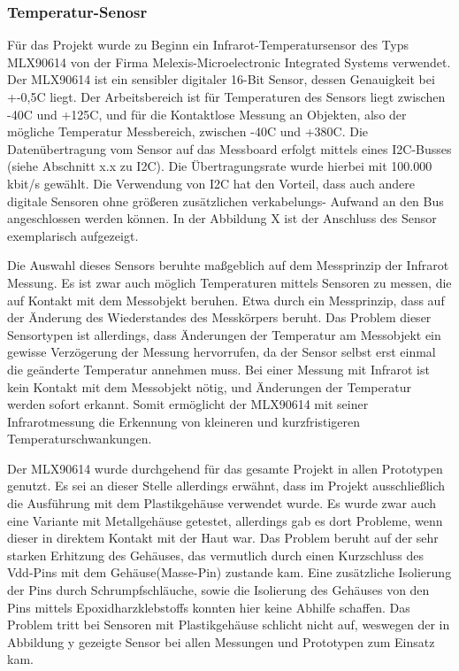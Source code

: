 \subsubsection{Temperatur-Senosr} \label{temp-1}

Für das Projekt wurde zu Beginn ein Infrarot-Temperatursensor des Typs MLX90614 von der Firma Melexis-Microelectronic Integrated Systems verwendet. Der MLX90614 ist ein sensibler digitaler  16-Bit Sensor, dessen Genauigkeit bei +-0,5C liegt. Der Arbeitsbereich ist für Temperaturen des Sensors liegt zwischen -40C und +125C, und für die Kontaktlose Messung an Objekten, also der mögliche Temperatur Messbereich, zwischen -40C und +380C. Die Datenübertragung vom Sensor auf das Messboard erfolgt mittels eines I2C-Busses (siehe Abschnitt x.x zu I2C). Die Übertragungsrate wurde hierbei mit 100.000 kbit/s gewählt. Die Verwendung von I2C hat den Vorteil, dass auch andere digitale Sensoren ohne größeren zusätzlichen verkabelungs- Aufwand an den Bus angeschlossen werden können. In der Abbildung X ist der Anschluss des Sensor exemplarisch aufgezeigt.


Die Auswahl dieses Sensors beruhte maßgeblich auf dem Messprinzip der Infrarot Messung. Es ist zwar auch möglich Temperaturen mittels Sensoren zu messen, die auf Kontakt mit dem Messobjekt beruhen. Etwa durch ein Messprinzip, dass auf der Änderung des Wiederstandes des Messkörpers beruht. Das Problem dieser Sensortypen ist allerdings, dass Änderungen der Temperatur am Messobjekt ein gewisse Verzögerung der Messung hervorrufen, da der Sensor selbst erst einmal die geänderte Temperatur annehmen muss. Bei einer Messung mit Infrarot ist kein Kontakt mit dem Messobjekt nötig, und Änderungen der Temperatur werden sofort erkannt. Somit ermöglicht der MLX90614 mit seiner Infrarotmessung die Erkennung von kleineren und kurzfristigeren Temperaturschwankungen.

Der MLX90614 wurde durchgehend für das gesamte Projekt in allen Prototypen genutzt. Es sei an dieser Stelle allerdings erwähnt, dass im Projekt ausschließlich die Ausführung mit dem Plastikgehäuse verwendet wurde. Es wurde zwar auch eine Variante mit Metallgehäuse getestet, allerdings gab es dort Probleme, wenn dieser in direktem Kontakt mit der Haut war. Das Problem beruht auf der sehr starken Erhitzung des Gehäuses, das vermutlich durch einen Kurzschluss des Vdd-Pins mit dem Gehäuse(Masse-Pin) zustande kam. Eine zusätzliche Isolierung der Pins durch Schrumpfschläuche, sowie die Isolierung des Gehäuses von den Pins mittels Epoxidharzklebstoffs konnten hier keine Abhilfe schaffen. Das Problem tritt bei Sensoren mit Plastikgehäuse schlicht nicht auf, weswegen der in Abbildung y gezeigte Sensor bei allen Messungen und Prototypen zum Einsatz kam.





